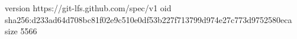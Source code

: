 version https://git-lfs.github.com/spec/v1
oid sha256:d233ad64d708bc81f02e9c510e0df53b227f713799d974e27c773d9752580eca
size 5566
